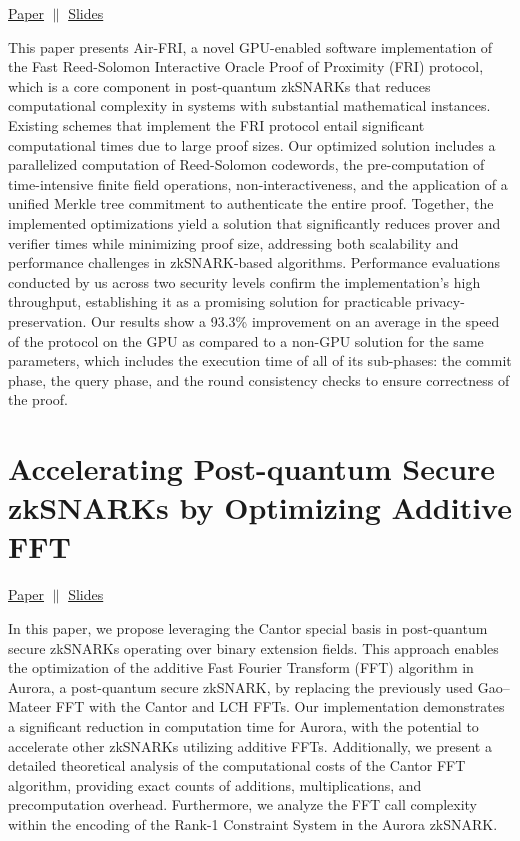 \documentclass[11pt]{article}
\theoremstyle{definition}
\theoremstyle{remark}
\theoremstyle{plain}
\begin{document}
\begin{center}
	\href{https://sacworkshop.org/SAC25/preproceedings/sac2025-1-paper8.pdf}{Paper} $\|$ \href{https://sacworkshop.org/SAC25/slides/Jandhyala.pdf}{Slides}
\end{center}


This
paper presents Air-FRI, a novel GPU-enabled software implementation
of the Fast Reed-Solomon Interactive Oracle Proof of Proximity (FRI)
protocol, which is a core component in post-quantum zkSNARKs that
reduces computational complexity in systems with substantial mathematical instances. Existing schemes that implement the FRI protocol
entail significant computational times due to large proof sizes. Our optimized solution includes a parallelized computation of Reed-Solomon
codewords, the pre-computation of time-intensive finite field operations,
non-interactiveness, and the application of a unified Merkle tree commitment to authenticate the entire proof. Together, the implemented optimizations yield a solution that significantly reduces prover and verifier
times while minimizing proof size, addressing both scalability and performance challenges in zkSNARK-based algorithms. Performance evaluations conducted by us across two security levels confirm the implementation’s high throughput, establishing it as a promising solution for
practicable privacy-preservation. Our results show a 93.3\% improvement
on an average in the speed of the protocol on the GPU as compared to a
non-GPU solution for the same parameters, which includes the execution
time of all of its sub-phases: the commit phase, the query phase, and the
round consistency checks to ensure correctness of the proof. 

\section{Accelerating Post-quantum Secure zkSNARKs by
Optimizing Additive FFT}
\begin{center}
\href{https://sacworkshop.org/SAC25/preproceedings/sac2025-2-paper17.pdf}{Paper} $\|$ \href{https://sacworkshop.org/SAC25/slides/Badakhshan.pdf}{Slides}
\end{center}

In this paper, we propose
leveraging the Cantor special basis in post-quantum secure zkSNARKs
operating over binary extension fields. This approach enables the optimization of the additive Fast Fourier Transform (FFT) algorithm in
Aurora, a post-quantum secure zkSNARK, by replacing the previously
used Gao–Mateer FFT with the Cantor and LCH FFTs. Our implementation demonstrates a significant reduction in computation time for
Aurora, with the potential to accelerate other zkSNARKs utilizing additive FFTs. Additionally, we present a detailed theoretical analysis of
the computational costs of the Cantor FFT algorithm, providing exact
counts of additions, multiplications, and precomputation overhead. Furthermore, we analyze the FFT call complexity within the encoding of
the Rank-1 Constraint System in the Aurora zkSNARK.



%
%
\printbibliography
\end{document}
